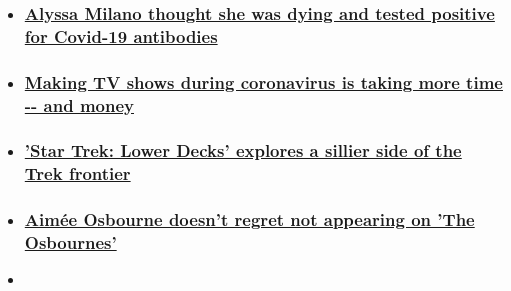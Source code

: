 \begin{itemize}
\item
  \hypertarget{alyssa-milano-thought-she-was-dying-and-tested-positive-for-covid-19-antibodies-}{%
  \subsubsection{\texorpdfstring{\href{/2020/08/06/entertainment/alyssa-milano-covid-antibodies/index.html}{Alyssa
  Milano thought she was dying and tested positive for Covid-19
  antibodies
  }}{Alyssa Milano thought she was dying and tested positive for Covid-19 antibodies }}\label{alyssa-milano-thought-she-was-dying-and-tested-positive-for-covid-19-antibodies-}}
\item
  \hypertarget{making-tv-shows-during-coronavirus-is-taking-more-time----and-money}{%
  \subsubsection{\texorpdfstring{\href{/2020/08/06/entertainment/tv-production-coronavirus/index.html}{Making
  TV shows during coronavirus is taking more time -\/- and
  money}}{Making TV shows during coronavirus is taking more time -\/- and money}}\label{making-tv-shows-during-coronavirus-is-taking-more-time----and-money}}
\item
  \hypertarget{star-trek-lower-decks-explores-a-sillier-side-of-the-trek-frontier}{%
  \subsubsection{\texorpdfstring{\href{/2020/08/06/entertainment/star-trek-lower-decks-review/index.html}{'Star
  Trek: Lower Decks' explores a sillier side of the Trek
  frontier}}{'Star Trek: Lower Decks' explores a sillier side of the Trek frontier}}\label{star-trek-lower-decks-explores-a-sillier-side-of-the-trek-frontier}}
\item
  \hypertarget{aimuxe9e-osbourne-doesnt-regret-not-appearing-on-the-osbournes}{%
  \subsubsection{\texorpdfstring{\href{/2020/08/06/entertainment/aimee-osbourne-the-osbournes-trnd/index.html}{Aimée
  Osbourne doesn't regret not appearing on 'The
  Osbournes'}}{Aimée Osbourne doesn't regret not appearing on 'The Osbournes'}}\label{aimuxe9e-osbourne-doesnt-regret-not-appearing-on-the-osbournes}}
\item
  \hypertarget{cameron-diaz-reveals-why-she-quit-acting-in-interview-with-gwyneth-paltrow}{%
}
\end{itemize}

